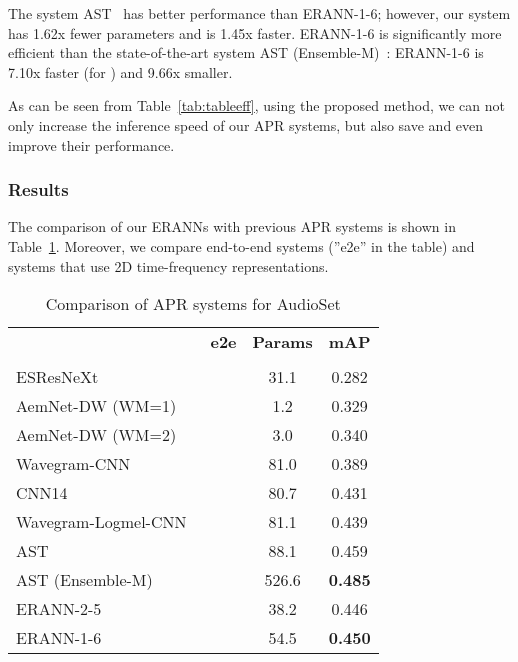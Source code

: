 \documentclass{article}
\begin{document}
\begin{sloppy}
The system AST~\cite{gong21b_interspeech} has better performance than \mbox{ERANN-1-6}; however, our system has 1.62x fewer parameters and is 1.45x faster. \mbox{ERANN-1-6} is significantly more efficient than the state-of-the-art system AST (\mbox{Ensemble-M})~\cite{gong21b_interspeech}: \mbox{ERANN-1-6} is 7.10x faster (for ) and 9.66x smaller.


As can be seen from Table~\ref{tab:tableeff}, using the proposed method, we can not only increase the inference speed of our APR systems, but also save and even improve their performance.


\subsubsection{Results}
The comparison of our ERANNs with previous APR systems is shown in Table~\ref{tab:tableresults}. Moreover, we compare end-to-end systems (''e2e'' in the table) and systems that use 2D time-frequency representations. 

\vspace{-1.5em}
 \begin{table}[th]
  \caption{Comparison of APR systems for AudioSet}
  \centering
  \begin{tabular}{lccc}
  \hline
& \textbf{e2e} & \textbf{Params} & \textbf{mAP}\\
  & &  \textbf{\footnotesize{}} & \\ 
    \hline
ESResNeXt~\cite{Guzhov2021ESResNeXtfbspLR}&  & 31.1 & 0.282 \\
AemNet-DW (WM=1)~\cite{9414229} &  & 1.2 & 0.329 \\
AemNet-DW (WM=2)~\cite{9414229} &  & 3.0 & 0.340 \\
Wavegram-CNN~\cite{9229505} &  & 81.0 &  0.389\\
CNN14~\cite{9229505} &  & 80.7 & 0.431\\
Wavegram-Logmel-CNN~\cite{9229505} &  & 81.1 & 0.439\\
AST~\cite{gong21b_interspeech}  &  & 88.1 & 0.459 \\
AST (Ensemble-M)~\cite{gong21b_interspeech} &  & 526.6 & \textbf{0.485} \\
\hline

ERANN-2-5  &&38.2 & 0.446\\
ERANN-1-6  && 54.5 & \textbf{0.450}\\ \hline
 \end{tabular}
  
  \label{tab:tableresults}
 

\end{table}
\end{sloppy}
\end{document}
